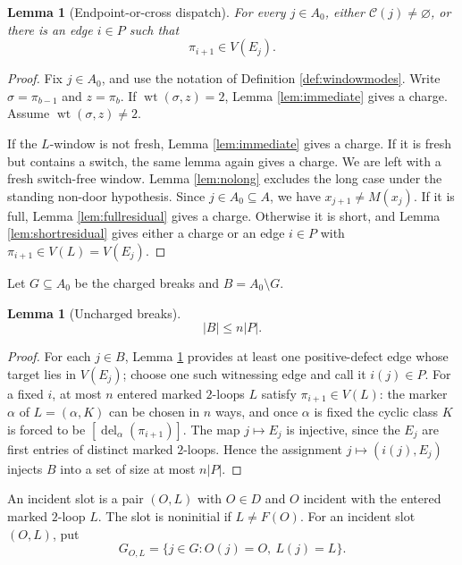 \documentclass[11pt]{article}
\newtheorem{lemma}[theorem]{Lemma}
\DeclareMathOperator{\wt}{wt}
\begin{document}
\begin{lemma}[Endpoint-or-cross dispatch]\label{lem:dispatch}
For every \(j\in A_0\), either \(\mathcal C(j)\ne\varnothing\), or there is an edge
\(i\in P\) such that
\[
  \pi_{i+1}\in V(E_j).
\]
\end{lemma}

\begin{proof}
Fix \(j\in A_0\), and use the notation of Definition \ref{def:windowmodes}.  Write
\(\sigma=\pi_{b-1}\) and \(z=\pi_b\).  If \(\wt(\sigma,z)=2\), Lemma \ref{lem:immediate} gives a
charge.  Assume \(\wt(\sigma,z)\ne2\).

If the \(L\)-window is not fresh, Lemma \ref{lem:immediate} gives a charge.  If it is fresh but
contains a switch, the same lemma again gives a charge.  We are left with a fresh switch-free
window.  Lemma \ref{lem:nolong} excludes the long case under the standing non-door hypothesis.
Since \(j\in A_0\subseteq A\), we have \(x_{j+1}\ne M(x_j)\).  If it is full, Lemma
\ref{lem:fullresidual} gives a charge.  Otherwise it is short, and Lemma \ref{lem:shortresidual}
gives either a charge or an edge \(i\in P\) with \(\pi_{i+1}\in V(L)=V(E_j)\).
\end{proof}

Let \(G\subseteq A_0\) be the charged breaks and \(B=A_0\setminus G\).

\begin{lemma}[Uncharged breaks]\label{lem:uncharged}
\[
  |B|\le n|P|. \tag{8}
\]
\end{lemma}

\begin{proof}
For each \(j\in B\), Lemma \ref{lem:dispatch} provides at least one positive-defect edge whose
target lies in \(V(E_j)\); choose one such witnessing edge and call it \(i(j)\in P\).  For a
fixed \(i\), at most \(n\) entered marked \(2\)-loops \(L\) satisfy
\(\pi_{i+1}\in V(L)\): the marker \(\alpha\) of \(L=(\alpha,K)\) can be chosen in \(n\) ways, and once \(\alpha\)
is fixed the cyclic class \(K\) is forced to be
\([\operatorname{del}_\alpha(\pi_{i+1})]\).  The map \(j\mapsto E_j\) is injective, since the \(E_j\) are
first entries of distinct marked \(2\)-loops.  Hence the assignment \(j\mapsto(i(j),E_j)\) injects
\(B\) into a set of size at most \(n|P|\).
\end{proof}

An incident slot
is a pair \((O,L)\) with \(O\in D\) and \(O\) incident with the entered marked \(2\)-loop \(L\).
The slot is noninitial if
\(L\ne F(O)\).  For an incident slot \((O,L)\), put
\[
  G_{O,L}=\{j\in G:O(j)=O,\ L(j)=L\}.
\]
\end{document}
